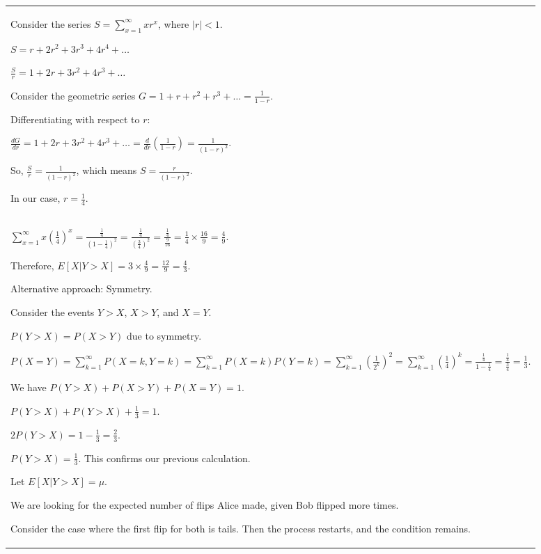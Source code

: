 \documentclass{article}
\theoremstyle{plain}
\theoremstyle{definition}
\theoremstyle{remark}
\newcommand{\defaultlightblue}[1]{{\leavevmode\color{bluec}#1}}
\begin{document}
\begin{longtable}{@{}p{\columnwidth}@{}}
{Consider the series $S = \sum_{x=1}^\infty x r^x$, where $|r| < 1$.

$S = r + 2r^2 + 3r^3 + 4r^4 + \dots$

$\frac{S}{r} = 1 + 2r + 3r^2 + 4r^3 + \dots$

Consider the geometric series $G = 1 + r + r^2 + r^3 + \dots = \frac{1}{1-r}$.

Differentiating with respect to $r$:

$\frac{dG}{dr} = 1 + 2r + 3r^2 + 4r^3 + \dots = \frac{d}{dr} (\frac{1}{1-r}) = \frac{1}{(1-r)^2}$.



So, $\frac{S}{r} = \frac{1}{(1-r)^2}$, which means $S = \frac{r}{(1-r)^2}$.



In our case, $r = \frac{1}{4}$.
}
\\
\defaultlightblue{
$\sum_{x=1}^\infty x (\frac{1}{4})^x = \frac{\frac{1}{4}}{(1 - \frac{1}{4})^2} = \frac{\frac{1}{4}}{(\frac{3}{4})^2} = \frac{\frac{1}{4}}{\frac{9}{16}} = \frac{1}{4} \times \frac{16}{9} = \frac{4}{9}$.



Therefore, $E[X | Y > X] = 3 \times \frac{4}{9} = \frac{12}{9} = \frac{4}{3}$.



Alternative approach: Symmetry.

Consider the events $Y > X$, $X > Y$, and $X = Y$.

$P(Y > X) = P(X > Y)$ due to symmetry.

$P(X = Y) = \sum_{k=1}^\infty P(X=k, Y=k) = \sum_{k=1}^\infty P(X=k) P(Y=k) = \sum_{k=1}^\infty (\frac{1}{2^k})^2 = \sum_{k=1}^\infty (\frac{1}{4})^k = \frac{\frac{1}{4}}{1 - \frac{1}{4}} = \frac{\frac{1}{4}}{\frac{3}{4}} = \frac{1}{3}$.



We have $P(Y > X) + P(X > Y) + P(X = Y) = 1$.

$P(Y > X) + P(Y > X) + \frac{1}{3} = 1$.

$2 P(Y > X) = 1 - \frac{1}{3} = \frac{2}{3}$.

$P(Y > X) = \frac{1}{3}$. This confirms our previous calculation.



Let $E[X | Y > X] = \mu$.

We are looking for the expected number of flips Alice made, given Bob flipped more times.



Consider the case where the first flip for both is tails. Then the process restarts, and the condition remains.

}
\end{longtable}
\end{document}
